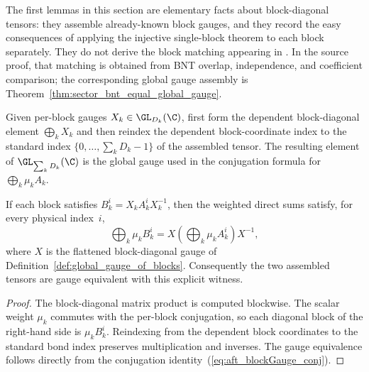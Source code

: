 The first lemmas in this section are elementary facts about block-diagonal tensors:
they assemble already-known block gauges, and they record the easy consequences
of applying the injective single-block theorem to each block separately. They do
not derive the block matching appearing in
\cite[Theorem~2.10]{Cirac2016MPDO_arXiv}. In the source proof, that matching
is obtained from BNT overlap, independence, and coefficient comparison; the
corresponding global gauge assembly is
Theorem~\ref{thm:sector_bnt_equal_global_gauge}.

\begin{definition}%
    \label{def:global_gauge_of_blocks}
    \leanok
    Given per-block gauges $X_k \in \GL_{D_k}(\C)$, first form the
    dependent block-diagonal element $\bigoplus_k X_k$ and then reindex the
    dependent block-coordinate index to the standard index
    $\{0,\dots,\sum_k D_k-1\}$ of the assembled tensor.
    The resulting element of $\GL_{\sum_k D_k}(\C)$ is the global gauge used
    in the conjugation formula for $\bigoplus_k \mu_k A_k$.
\end{definition}

\begin{lemma}%
    \label{lem:tensor_from_blocks_globalGauge_conj}
    \leanok
    If each block satisfies $B_k^i=X_k A_k^i X_k^{-1}$, then the weighted
    direct sums satisfy, for every physical index~$i$,
    \begin{equation}\label{eq:aft_blockGauge_conj}
        \bigoplus_k \mu_k B_k^i
        = X\left(\bigoplus_k \mu_k A_k^i\right)X^{-1},
    \end{equation}
    where $X$ is the flattened block-diagonal gauge of
    Definition~\ref{def:global_gauge_of_blocks}. Consequently the two
    assembled tensors are gauge equivalent with this explicit witness.
\end{lemma}

\begin{proof}\leanok
    The block-diagonal matrix product is computed blockwise. The scalar weight
    $\mu_k$ commutes with the per-block conjugation, so each diagonal block of
    the right-hand side is $\mu_k B_k^i$. Reindexing from the dependent block
    coordinates to the standard bond index preserves multiplication and
    inverses. The gauge equivalence follows directly from the conjugation
    identity~(\ref{eq:aft_blockGauge_conj}).
\end{proof}

